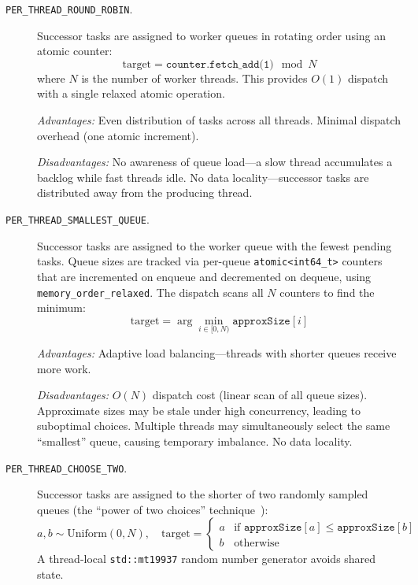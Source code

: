 \begin{description}
    \item[\texttt{PER\_THREAD\_ROUND\_ROBIN}.]
    Successor tasks are assigned to worker queues in rotating order using an atomic counter:
    \[
        \text{target} = \texttt{counter.fetch\_add(1)} \mod N
    \]
    where $N$ is the number of worker threads.
    This provides $O(1)$ dispatch with a single relaxed atomic operation.

    \textit{Advantages:} Even distribution of tasks across all threads.
    Minimal dispatch overhead (one atomic increment).

    \textit{Disadvantages:} No awareness of queue load---a slow thread accumulates a backlog while fast threads idle.
    No data locality---successor tasks are distributed away from the producing thread.

    \item[\texttt{PER\_THREAD\_SMALLEST\_QUEUE}.]
    Successor tasks are assigned to the worker queue with the fewest pending tasks.
    Queue sizes are tracked via per-queue \texttt{atomic<int64\_t>} counters that are incremented on enqueue and decremented on dequeue, using \texttt{memory\_order\_relaxed}.
    The dispatch scans all $N$ counters to find the minimum:
    \[
        \text{target} = \arg\min_{i \in [0,N)} \texttt{approxSize}[i]
    \]

    \textit{Advantages:} Adaptive load balancing---threads with shorter queues receive more work.

    \textit{Disadvantages:} $O(N)$ dispatch cost (linear scan of all queue sizes).
    Approximate sizes may be stale under high concurrency, leading to suboptimal choices.
    Multiple threads may simultaneously select the same ``smallest'' queue, causing temporary imbalance.
    No data locality.

    \item[\texttt{PER\_THREAD\_CHOOSE\_TWO}.]
    Successor tasks are assigned to the shorter of two randomly sampled queues (the ``power of two choices'' technique~\cite{mitzenmacher2001power}):
    \[
        a, b \sim \text{Uniform}(0, N), \quad \text{target} =
        \begin{cases}
            a & \text{if } \texttt{approxSize}[a] \leq \texttt{approxSize}[b] \\
            b & \text{otherwise}
        \end{cases}
    \]
    A thread-local \texttt{std::mt19937} random number generator avoids shared state.


\end{description}
